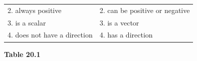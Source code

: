 {{\begin{center}
\begin{xtabular}[t]{|l|l|}
        2. always positive &
    
    
        2. can be positive or negative%
     \tabularnewline{}
    
    
        3. is a scalar &
    
    
        3. is a vector%
     \tabularnewline{}
    
    
        4. does not have a direction &
    
    
        4. has a direction%
     \tabularnewline{}
    \end{xtabular}
      \end{center}
    \begin{center}{\small\bfseries Table 20.1}\end{center}
    
    \addtocounter{footnote}{-0}
    
          } %
        }{%
        }
